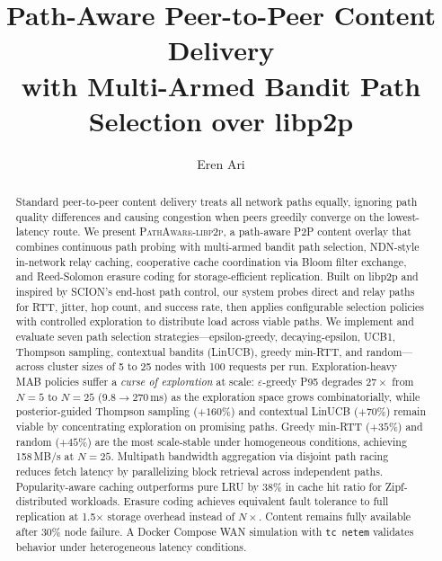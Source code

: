 \documentclass[sigconf,nonacm]{acmart}
\begin{document}
\title{Path-Aware Peer-to-Peer Content Delivery\\with Multi-Armed Bandit Path Selection over libp2p}

\author{Eren Ari}

\begin{abstract}
Standard peer-to-peer content delivery treats all network paths equally, ignoring path quality differences and causing congestion when peers greedily converge on the lowest-latency route. We present \textsc{PathAware-libp2p}, a path-aware P2P content overlay that combines continuous path probing with multi-armed bandit path selection, NDN-style in-network relay caching, cooperative cache coordination via Bloom filter exchange, and Reed-Solomon erasure coding for storage-efficient replication. Built on libp2p and inspired by SCION's end-host path control, our system probes direct and relay paths for RTT, jitter, hop count, and success rate, then applies configurable selection policies with controlled exploration to distribute load across viable paths. We implement and evaluate seven path selection strategies---epsilon-greedy, decaying-epsilon, UCB1, Thompson sampling, contextual bandits (LinUCB), greedy min-RTT, and random---across cluster sizes of 5 to 25 nodes with 100 requests per run. Exploration-heavy MAB policies suffer a \emph{curse of exploration} at scale: $\varepsilon$-greedy P95 degrades $27{\times}$ from $N{=}5$ to $N{=}25$ (9.8$\to$270\,ms) as the exploration space grows combinatorially, while posterior-guided Thompson sampling ($+160\%$) and contextual LinUCB ($+70\%$) remain viable by concentrating exploration on promising paths. Greedy min-RTT ($+35\%$) and random ($+45\%$) are the most scale-stable under homogeneous conditions, achieving 158\,MB/s at $N{=}25$. Multipath bandwidth aggregation via disjoint path racing reduces fetch latency by parallelizing block retrieval across independent paths. Popularity-aware caching outperforms pure LRU by 38\% in cache hit ratio for Zipf-distributed workloads. Erasure coding achieves equivalent fault tolerance to full replication at 1.5$\times$ storage overhead instead of $N\times$. Content remains fully available after 30\% node failure. A Docker Compose WAN simulation with \texttt{tc netem} validates behavior under heterogeneous latency conditions.
\end{abstract}

\end{document}
